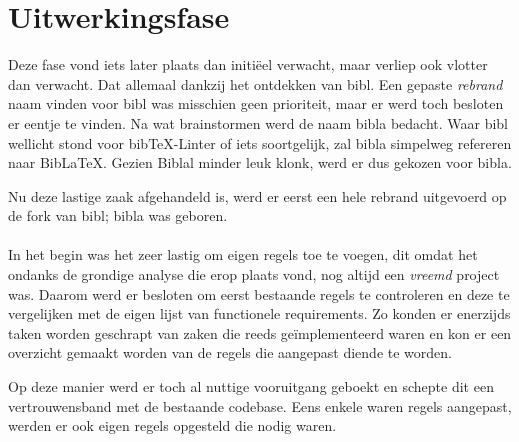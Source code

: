 \chapter{Uitwerkingsfase}
\label{ch:uitwerkingsfase}


Deze fase vond iets later plaats dan initiëel verwacht, maar verliep ook vlotter dan verwacht. Dat allemaal dankzij het ontdekken van bibl. Een gepaste \emph{rebrand} naam vinden voor bibl was misschien geen prioriteit, maar er werd toch besloten er eentje te vinden. Na wat brainstormen werd de naam bibla bedacht. Waar bibl wellicht stond voor bibTeX-Linter of iets soortgelijk, zal bibla simpelweg refereren naar BibLaTeX. Gezien Biblal minder leuk klonk, werd er dus gekozen voor bibla.

Nu deze lastige zaak afgehandeld is, werd er eerst een hele rebrand uitgevoerd op de fork van bibl; bibla was geboren.
\\
\\
In het begin was het zeer lastig om eigen regels toe te voegen, dit omdat het ondanks de grondige analyse die erop plaats vond, nog altijd een \emph{vreemd} project was. Daarom werd er besloten om eerst bestaande regels te controleren en deze te vergelijken met de eigen lijst van functionele requirements.
Zo konden er enerzijds taken worden geschrapt van zaken die reeds geïmplementeerd waren en kon er een overzicht gemaakt worden van de regels die aangepast diende te worden. 

Op deze manier werd er toch al nuttige vooruitgang geboekt en schepte dit een vertrouwensband met de bestaande codebase. Eens enkele waren regels aangepast, werden er ook eigen regels opgesteld die nodig waren.
